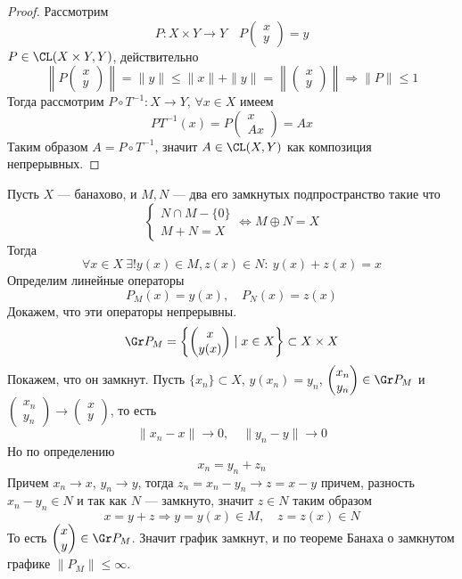\begin{proof}
	Рассмотрим 
	$$
	P \colon X \times Y \to Y \quad P \left(\begin{matrix}
		x \\ y
	\end{matrix}\right) = y
	$$
	$ P \in \CL(X \times Y, Y)$, действительно 
	$$
	\left\|P \left(\begin{matrix}
		x \\ y
	\end{matrix}\right)\right\| = \|y\| \leq \|x\| + \|y\| = \left\| \left(\begin{matrix}
	x \\ y
\end{matrix}\right)\right\| \Rightarrow \|P\| \leq 1 
	$$
	Тогда рассмотрим $ P \circ T^{-1} \colon X \to Y$, $\forall x \in X$ имеем
	$$
	PT^{-1}(x) = P \left(\begin{matrix}
		x \\ Ax
	\end{matrix}\right) = Ax
	$$
	Таким образом $A = P \circ T^{-1}$, значит $A \in \CL(X, Y)$ как композиция непрерывных. 
\end{proof}
\begin{example}
	Пусть $X$ --- банахово, и $M,N$ --- два его замкнутых подпространство такие что
	$$
	\begin{cases}
		N \cap M - \{0\} \\
		M + N = X
	\end{cases} \Leftrightarrow M \oplus N = X
	$$
	Тогда
	$$
	\forall x \in X \ \exists ! y(x) \in M , z(x) \in N: \ y(x) + z(x) = x
	$$
	Определим линейные операторы
	$$
	P_M(x) = y(x), \quad P_N(x) = z(x)
	$$
	Докажем, что эти операторы непрерывны. 
	$$
	\Gr P_M = \left\{\left(\begin{matrix}
		x \\ y(x)
	\end{matrix}\right)\mid x \in X\right\} \subset X \times X
	$$
	Покажем, что он замкнут. Пусть $ \{x_n\} \subset X$,  $y(x_n) = y_n$, $ \left(\begin{matrix}
		x_n \\ y_n
	\end{matrix}\right) \in \Gr P_M$ и $\left(\begin{matrix}
	x_n \\ y_n
\end{matrix}\right) \to \left(\begin{matrix}
x \\ y
\end{matrix}\right)$, то есть
$$
\|x_n - x\| \to 0, \quad \|y_n - y\| \to 0
$$
Но по определению 
$$
x_n = y_n + z_n
$$
Причем $x_n \to x$, $y_n \to y$, тогда $z_n = x_n - y_n \to z = x-y$ причем, разность $x_n - y_n \in N$ и так как $N$ --- замкнуто, значит $z \in N$ таким образом 
$$
x = y + z \Rightarrow y = y(x) \in M,  \quad z = z(x) \in N
$$
То есть $\left(\begin{matrix}
	x \\ y
\end{matrix}\right)\in \Gr P_M$. Значит график замкнут, и по теореме Банаха о замкнутом графике $\|P_M\| \leq \infty$.
\end{example}
